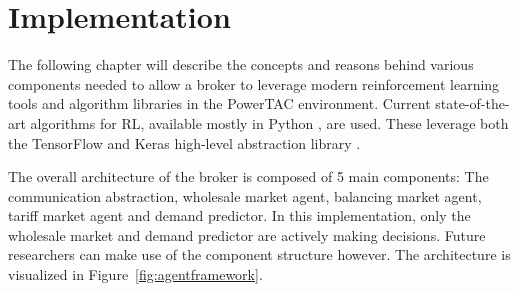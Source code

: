 \chapter{Implementation}
\label{cha:implementation}

The following chapter will describe the concepts and reasons behind various components needed to allow a broker to
leverage modern reinforcement learning tools and algorithm libraries in the \ac{PowerTAC} environment. Current state-of-the-art
algorithms for \ac{RL}, available mostly in Python \citep{baselines}, are used. These leverage both the TensorFlow and
Keras high-level abstraction library \citep{plappert2016kerasrl}.


The overall architecture of the broker is composed of 5 main components: The communication abstraction, wholesale market
agent, balancing market agent, tariff market agent and demand predictor. In this implementation, only the wholesale
market and demand predictor are actively making decisions. Future researchers can make use of the component structure however.
The architecture is visualized in Figure~\ref{fig:agentframework}.

